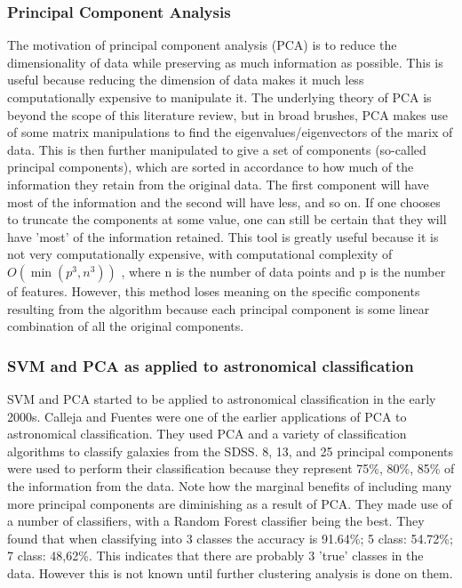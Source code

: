 \documentclass[a4paper,11pt]{article}
\begin{document}
\subsubsection{Principal Component Analysis}
The motivation of principal component analysis (PCA) is to reduce the dimensionality of data while preserving as much information as possible. This is useful because reducing the dimension of data makes it much less computationally expensive to manipulate it. The underlying theory of PCA is beyond the scope of this literature review, but in broad brushes, PCA makes use of some matrix manipulations to find the eigenvalues/eigenvectors of the marix of data. This is then further manipulated to give a set of components (so-called principal components), which are sorted in accordance to how much of the information they retain from the original data. The first component will have most of the information and the second will have less, and so on. If one chooses to truncate the components at some value, one can still be certain that they will have 'most' of the information retained. This tool is greatly useful because it is not very computationally expensive, with computational complexity of $O(\min(p^3,n^3))$ \cite{johnstone_2009_on}, where n is the number of data points and p is the number of features. However, this method loses meaning on the specific components resulting from the algorithm because each principal component is some linear combination of all the original components.
\subsubsection{SVM and PCA as applied to astronomical classification}
SVM and PCA started to be applied to astronomical classification in the early 2000s. Calleja and Fuentes were one of the earlier applications of PCA to astronomical classification.\cite{delacalleja_2004_automated} They used PCA and a variety of classification algorithms to classify galaxies from the SDSS. 8, 13, and 25 principal components were used to perform their classification because they represent 75\%, 80\%, 85\% of the information from the data. Note how the marginal benefits of including many more principal components are diminishing as a result of PCA. They made use of a number of classifiers, with a Random Forest classifier being the best. They found that when classifying into 3 classes the accuracy is 91.64\%; 5 class: 54.72\%; 7 class: 48,62\%. This indicates that there are probably 3 'true' classes in the data. However this is not known until further clustering analysis is done on them.
\end{document}
